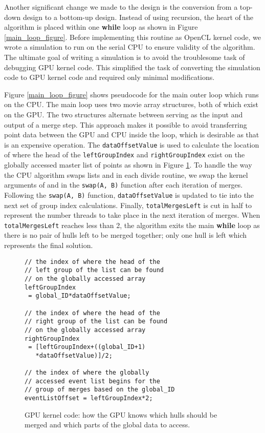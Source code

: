 \documentclass{article}
\begin{document}
Another significant change we made to the design is the conversion from a top-down design to a bottom-up design. Instead of using recursion, the heart of the algorithm is placed within one \textbf{while} loop as shown in Figure \ref{main_loop_figure}. Before implementing this routine as OpenCL kernel code, we wrote a simulation to run on the serial CPU to ensure validity of the algorithm. The ultimate goal of writing a simulation is to avoid the troublesome task of debugging GPU kernel code. This simplified the task of converting the simulation code to GPU kernel code and required only minimal modifications.

Figure \ref{main_loop_figure} shows pseudocode for the main outer loop which runs on the CPU. The main loop uses two movie array structures, both of which exist on the GPU. The two structures alternate between serving as the input and output of a merge step. This approach makes it possible to avoid transferring point data between the GPU and CPU inside the loop, which is desirable as that is an expensive operation. The \texttt{dataOffsetValue} is used to calculate the location of where the head of the \texttt{leftGroupIndex} and \texttt{rightGroupIndex} exist on the globally accessed master list of points  as shown in Figure \ref{kernel_variables}. To handle the way the CPU algorithm swaps lists  and  in each divide routine, we swap the kernel arguments of  and  in the \texttt{swap(A, B)} function after each iteration of merges. Following the \texttt{swap(A, B)} function, \texttt{dataOffsetValue} is updated to tie into the next set of group index calculations. Finally, \texttt{totalMergesLeft} is cut in half to represent the number threads to take place in the next iteration of merges. When \texttt{totalMergesLeft} reaches less than 2, the algorithm exits the main \textbf{while} loop as there is no pair of hulls left to be merged together; only one hull is left which represents the final solution.

\begin{figure}
\begin{lstlisting}
// the index of where the head of the 
// left group of the list can be found 
// on the globally accessed array
leftGroupIndex 
 = global_ID*dataOffsetValue;

// the index of where the head of the 
// right group of the list can be found 
// on the globally accessed array
rightGroupIndex 
 = [leftGroupIndex+((global_ID+1) 
   *dataOffsetValue)]/2;

// the index of where the globally
// accessed event list begins for the
// group of merges based on the global_ID
eventListOffset = leftGroupIndex*2;
\end{lstlisting}
\caption{GPU kernel code: how the GPU knows which hulls should be merged and which parts of the global data to access.}
\label{kernel_variables}
\end{figure}
\end{document}
